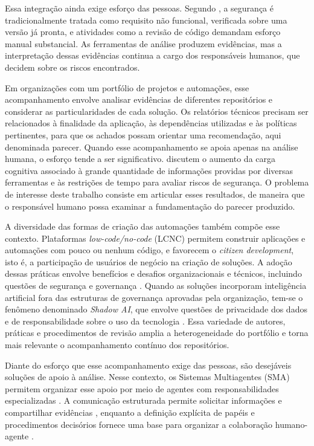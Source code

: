 Essa integração ainda exige esforço das pessoas. Segundo , a segurança é tradicionalmente tratada como requisito não funcional, verificada sobre uma versão já pronta, e atividades como a revisão de código demandam esforço manual substancial. As ferramentas de análise produzem evidências, mas a interpretação dessas evidências continua a cargo dos responsáveis humanos, que decidem sobre os riscos encontrados.

Em organizações com um portfólio de projetos e automações, esse acompanhamento envolve analisar evidências de diferentes repositórios e considerar as particularidades de cada solução. Os relatórios técnicos precisam ser relacionados à finalidade da aplicação, às dependências utilizadas e às políticas pertinentes, para que os achados possam orientar uma recomendação, aqui denominada parecer. Quando esse acompanhamento se apoia apenas na análise humana, o esforço tende a ser significativo.  discutem o aumento da carga cognitiva associado à grande quantidade de informações providas por diversas ferramentas e às restrições de tempo para avaliar riscos de segurança. O problema de interesse deste trabalho consiste em articular esses resultados, de maneira que o responsável humano possa examinar a fundamentação do parecer produzido.

A diversidade das formas de criação das automações também compõe esse contexto. Plataformas \textit{low-code/no-code} (LCNC) permitem construir aplicações e automações com pouco ou nenhum código, e favorecem o \textit{citizen development}, isto é, a participação de usuários de negócio na criação de soluções. A adoção dessas práticas envolve benefícios e desafios organizacionais e técnicos, incluindo questões de segurança e governança \cite{ajimati2025}. Quando as soluções incorporam inteligência artificial fora das estruturas de governança aprovadas pela organização, tem-se o fenômeno denominado \textit{Shadow AI}, que envolve questões de privacidade dos dados e de responsabilidade sobre o uso da tecnologia \cite{silic2025}. Essa variedade de autores, práticas e procedimentos de revisão amplia a heterogeneidade do portfólio e torna mais relevante o acompanhamento contínuo dos repositórios.

Diante do esforço que esse acompanhamento exige das pessoas, são desejáveis soluções de apoio à análise. Nesse contexto, os Sistemas Multiagentes (SMA) permitem organizar esse apoio por meio de agentes com responsabilidades especializadas \cite{wooldridge2009}. A comunicação estruturada permite solicitar informações e compartilhar evidências \cite{lazarin2025}, enquanto a definição explícita de papéis e procedimentos decisórios fornece uma base para organizar a colaboração humano-agente \cite{ait2025}.

